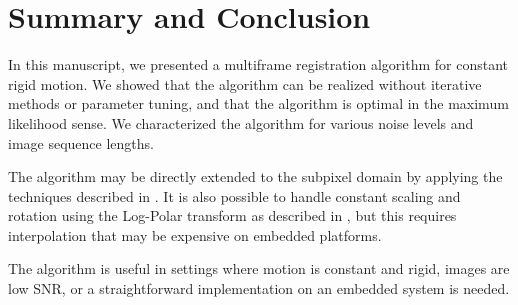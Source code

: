 \documentclass{article}
\begin{document}




\section{Summary and Conclusion}
\label{sec:future}

In this manuscript, we presented a multiframe registration algorithm for constant rigid motion.  We showed that the algorithm can be realized without iterative methods or parameter tuning, and that the algorithm is optimal in the maximum likelihood sense.  We characterized the algorithm for various noise levels and image sequence lengths.

The algorithm may be directly extended to the subpixel domain by applying the techniques described in \cite{guizar2008efficient}.  It is also possible to handle constant scaling and rotation using the Log-Polar transform as described in \cite{reddy1996fft}, but this requires interpolation that may be expensive on embedded platforms.

The algorithm is useful in settings where motion is constant and rigid, images are low SNR, or a straightforward implementation on an embedded system is needed.
\end{document}
